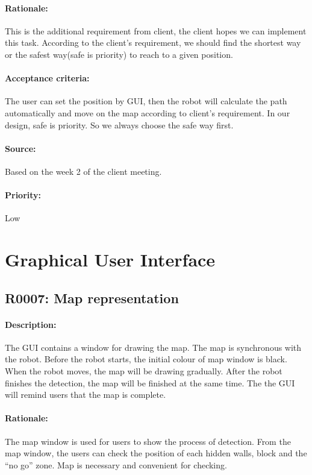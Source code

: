 \documentclass[11pt, a4paper]{report}
\begin{document}
\paragraph{Rationale:}
This is the additional requirement from client, the client hopes we can implement this task. According to the client's requirement, we should find the shortest way or the safest way(safe is priority) to reach to a given position. 
\paragraph{Acceptance criteria:}
The user can set the position by GUI, then the robot will calculate the path automatically and move on the map according to client's requirement. In our design, safe is priority. So we always choose the safe way first.     
\paragraph{Source:}
Based on the week 2 of the client meeting.  
\paragraph{Priority:}
Low


\section{Graphical User Interface}
\subsection{R0007: Map representation}
\paragraph{Description:}
The GUI contains a window for drawing the map. The map is synchronous with the robot. Before the  robot starts, the initial colour of map window is black. When the robot moves, the map will be drawing gradually. After the robot finishes the detection, the map will be finished at the same time. The the GUI will remind users that the map is complete.
\paragraph{Rationale:}
The map window is used for users to show the process of detection. From the map window, the users can check the position of each hidden walls, block and the “no go” zone. Map is necessary and convenient for checking.
\end{document}
